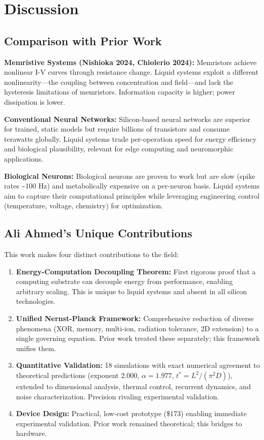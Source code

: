 \documentclass[11pt]{article}
\begin{document}
\section{Discussion}

\subsection{Comparison with Prior Work}

\textbf{Memristive Systems (Nishioka 2024, Chiolerio 2024):} Memristors achieve nonlinear I-V curves through resistance change. Liquid systems exploit a different nonlinearity—the coupling between concentration and field—and lack the hysteresis limitations of memristors. Information capacity is higher; power dissipation is lower.

\textbf{Conventional Neural Networks:} Silicon-based neural networks are superior for trained, static models but require billions of transistors and consume terawatts globally. Liquid systems trade per-operation speed for energy efficiency and biological plausibility, relevant for edge computing and neuromorphic applications.

\textbf{Biological Neurons:} Biological neurons are proven to work but are slow (spike rates \textasciitilde 100 Hz) and metabolically expensive on a per-neuron basis. Liquid systems aim to capture their computational principles while leveraging engineering control (temperature, voltage, chemistry) for optimization.

\subsection{Ali Ahmed's Unique Contributions}

This work makes four distinct contributions to the field:

\begin{enumerate}
\item \textbf{Energy-Computation Decoupling Theorem:} First rigorous proof that a computing substrate can decouple energy from performance, enabling arbitrary scaling. This is unique to liquid systems and absent in all silicon technologies.

\item \textbf{Unified Nernst-Planck Framework:} Comprehensive reduction of diverse phenomena (XOR, memory, multi-ion, radiation tolerance, 2D extension) to a single governing equation. Prior work treated these separately; this framework unifies them.

\item \textbf{Quantitative Validation:} 18 simulations with exact numerical agreement to theoretical predictions (exponent 2.000, $\alpha = 1.977$, $t^* = L^2/(\pi^2 D)$), extended to dimensional analysis, thermal control, recurrent dynamics, and noise characterization. Precision rivaling experimental validation.

\item \textbf{Device Design:} Practical, low-cost prototype (\$173) enabling immediate experimental validation. Prior work remained theoretical; this bridges to hardware.

\end{enumerate}
\end{document}
